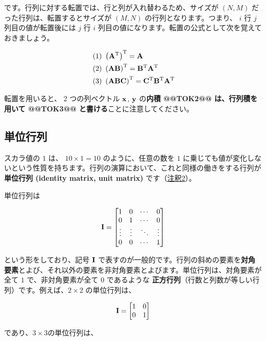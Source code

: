 です。行列に対する転置では、行と列が入れ替わるため、サイズが $(N, M)$ だった行列は、転置するとサイズが $(M, N)$ の行列となります。つまり、 $i$ 行 $j$ 列目の値が転置後には $j$ 行 $i$ 列目の値になります。転置の公式として次を覚えておきましょう。


\[
\begin{aligned}
&\left( 1\right) \ \left( {\bf A}^{\rm T} \right)^{\rm T} = {\bf A} \\
&\left( 2\right) \ \left( {\bf A}{\bf B} \right)^{\rm T} = {\bf B}^{\rm T}{\bf A}^{\rm T}\\
&\left( 3\right) \ \left( {\bf A}{\bf B}{\bf C} \right)^{\rm T} = {\bf C}^{\rm T}{\bf B}^{\rm T}{\bf A}^{\rm T}
\end{aligned}
\]



転置を用いると、 2 つの列ベクトル ${\bf x}$, ${\bf y}$ の\textbf{内積 @@TOK2@@ は、行列積を用いて @@TOK3@@ と書ける}ことに注意してください。


\subsection{単位行列}


スカラ値の $1$ は、 $10 \times 1 = 10$ のように、任意の数を $1$ に乗じても値が変化しないという性質を持ちます。行列の演算において、これと同様の働きをする行列が\textbf{単位行列 (identity matrix, unit matrix)} です（\hyperref[06a-basics-of-linear-algebra-note2]{注釈2}）。

単位行列は


\[
{\bf I} =
\begin{bmatrix}
1 & 0 & \cdots  & 0 \\
0 & 1 & \cdots  & 0 \\
\vdots & \vdots & \ddots & \vdots  \\
0 & 0 & \cdots  & 1
\end{bmatrix}
\]


という形をしており、記号 ${\bf I}$ で表すのが一般的です。行列の斜めの要素を\textbf{対角要素}とよび、それ以外の要素を非対角要素とよびます。単位行列は、対角要素が全て $1$ で、非対角要素が全て $0$ であるような \textbf{正方行列}（行数と列数が等しい行列）です。例えば、$2 \times 2$ の単位行列は、


\[
{\bf I} =
\begin{bmatrix}
1 & 0 \\
0 & 1
\end{bmatrix}
\]


であり、$3 \times 3$の単位行列は、



